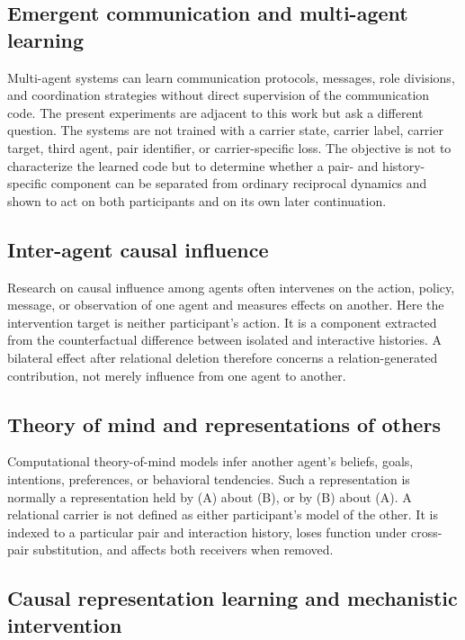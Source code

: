 \documentclass[11pt,a4paper]{article}
\begin{document}
\subsection{Emergent communication and multi-agent learning}

Multi-agent systems can learn communication protocols, messages, role divisions, and coordination strategies without direct supervision of the communication code. The present experiments are adjacent to this work but ask a different question. The systems are not trained with a carrier state, carrier label, carrier target, third agent, pair identifier, or carrier-specific loss. The objective is not to characterize the learned code but to determine whether a pair- and history-specific component can be separated from ordinary reciprocal dynamics and shown to act on both participants and on its own later continuation.

\subsection{Inter-agent causal influence}

Research on causal influence among agents often intervenes on the action, policy, message, or observation of one agent and measures effects on another. Here the intervention target is neither participant's action. It is a component extracted from the counterfactual difference between isolated and interactive histories. A bilateral effect after relational deletion therefore concerns a relation-generated contribution, not merely influence from one agent to another.

\subsection{Theory of mind and representations of others}

Computational theory-of-mind models infer another agent's beliefs, goals, intentions, preferences, or behavioral tendencies. Such a representation is normally a representation held by (A) about (B), or by (B) about (A). A relational carrier is not defined as either participant's model of the other. It is indexed to a particular pair and interaction history, loses function under cross-pair substitution, and affects both receivers when removed.

\subsection{Causal representation learning and mechanistic intervention}
\end{document}
